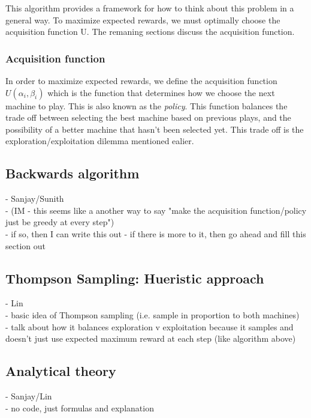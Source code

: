 \documentclass{article}
\begin{document}
This algorithm provides a framework for how to think about this problem in a general way. To maximize expected rewards, we must optimally choose the acquisition function U. The remaning sections discuss the acquisition function.

\subsubsection{Acquisition function}

In order to maximize expected rewards, we define the acquisition function $U(\alpha_i, \beta_i)$ which is the function that determines how we choose the next machine to play. This is also known as the \textit{policy}. This function balances the trade off between selecting the best machine based on previous plays, and the possibility of a better machine that hasn't been selected yet. This trade off is the exploration/exploitation dilemma mentioned ealier.\\

\subsection{Backwards algorithm}

- Sanjay/Sunith\\
- (IM - this seems like a another way to say {"make the acquisition function/policy just be greedy at every step"})\\
  - if so, then I can write this out
  - if there is more to it, then go ahead and fill this section out

\subsection{Thompson Sampling: Hueristic approach}

- Lin\\
- basic idea of Thompson sampling (i.e. sample in proportion to both machines)\\
- talk about how it balances exploration v exploitation because it samples and doesn't just use expected maximum reward at each step (like algorithm above)

\subsection{Analytical theory}

- Sanjay/Lin\\
- no code, just formulas and explanation
\end{document}
